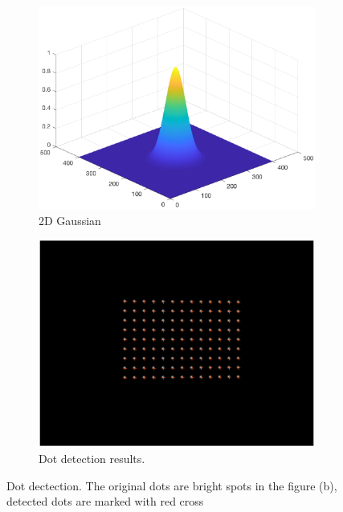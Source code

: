 \begin{figure}[h!]
	\centering
	\begin{subfigure}[t]{0.45\linewidth}
		\centering
		\includegraphics[width=1\linewidth]{figures/part2/gaussian_dis.eps}
		\caption{2D Gaussian}
		\label{fig:gaussian_dis}
	\end{subfigure}
	\begin{subfigure}[t]{0.45\linewidth}
		\centering
		\includegraphics[width=1\linewidth]{figures/part2/dot_detect.eps}
		\caption{Dot detection results.}
		\label{fig:dot_detect}
	\end{subfigure}
	\caption{Dot dectection. The original dots are bright spots in the figure (b), detected dots are marked with red cross}
\end{figure}

